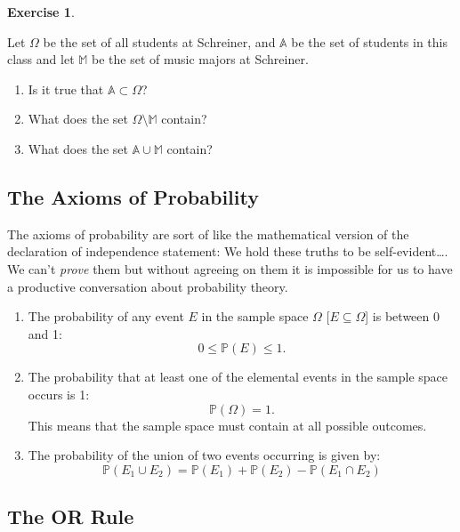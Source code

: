 \documentclass[
]{book}
\providecommand{\tightlist}{%
  \setlength{\itemsep}{0pt}\setlength{\parskip}{0pt}}
\newcommand{\prob}[1]{{\mathbb{P}(#1)}}
\theoremstyle{definition}
\theoremstyle{definition}
\theoremstyle{definition}
\newtheorem{exercise}{Exercise}[chapter]
\theoremstyle{definition}
\theoremstyle{remark}
\begin{document}
\begin{exercise}
\protect\hypertarget{exr:unnamed-chunk-225}{}\label{exr:unnamed-chunk-225}

Let \(\Omega\) be the set of all students at Schreiner, and \(\mathbb{A}\) be the set of students in this class and let \(\mathbb{M}\) be the set of music majors at Schreiner.

\begin{enumerate}
\def\labelenumi{\arabic{enumi}.}
\tightlist
\item
  Is it true that \(\mathbb{A} \subset \Omega\)?
\item
  What does the set \(\Omega \setminus \mathbb{M}\) contain?
\item
  What does the set \(\mathbb{A} \cup \mathbb{M}\) contain?
\end{enumerate}

\end{exercise}

\hypertarget{the-axioms-of-probability}{%
\subsection{The Axioms of Probability}\label{the-axioms-of-probability}}

The axioms of probability are sort of like the mathematical version of the declaration of independence statement: We hold these truths to be self-evident\ldots. We can't \emph{prove} them but without agreeing on them it is impossible for us to have a productive conversation about probability theory.

\begin{enumerate}
\def\labelenumi{\arabic{enumi}.}
\tightlist
\item
  The probability of any event \(E\) in the sample space \(\Omega\) {[}\(E \subseteq \Omega\){]} is between 0 and 1: \[ 0 \leq \prob{E} \leq 1.\]
\item
  The probability that at least one of the elemental events in the sample space occurs is 1: \[\prob{\Omega}=1.\] This means that the sample space must contain at all possible outcomes.
\item
  The probability of the union of two events occurring is given by: \[\prob{E_1 \cup E_2}=\prob{E_1}+\prob{E_2}-\prob{E_1 \cap E_2}\]
\end{enumerate}

\hypertarget{the-or-rule}{%
\subsection{The OR Rule}\label{the-or-rule}}
\end{document}
